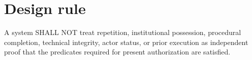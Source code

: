\section{Design rule}
\begin{requirement}[ACA-160-006]
A system SHALL NOT treat repetition, institutional possession, procedural completion, technical integrity, actor status, or prior execution as independent proof that the predicates required for present authorization are satisfied.
\end{requirement}
